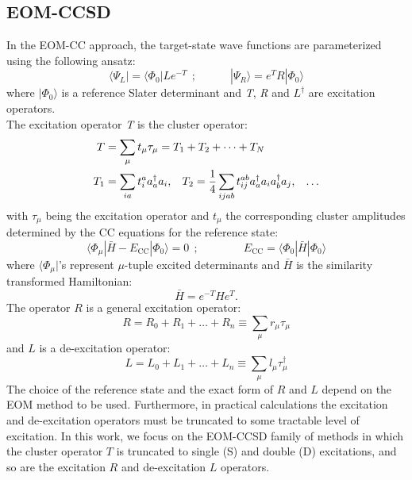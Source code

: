 \documentclass[journal=jctcce,manuscript=article]{achemso}
\begin{document}
\subsection{EOM-CCSD}
In the EOM-CC approach, the target-state wave functions are parameterized using the following ansatz:~\cite{sekino1984linear,Stanton:93:EOMCC,CC_EOMCC_Bartlett,krylov_eom_2008}
\begin{equation}
\langle \Psi_L | = \langle \Phi_0 |{L}e^{-T}~~;
\quad \quad \quad | \Psi_R \rangle =  e^{T} {R}| \Phi_0 \rangle 
\end{equation}
where $| \Phi_0 \rangle $ is a reference Slater determinant and \textit{T}, \textit{R} and $L^\dagger$ are excitation operators.\\
The excitation operator \textit{T} is the cluster operator:\cite{Note-1}
\begin{equation}
\begin{aligned}
T &= \sum_{\mu} t_{\mu} \tau_{\mu} = T_1 + T_2 + \dots + T_N \\
T_1 &= \sum_{ia} t_i^a a_a^{\dagger}a_i ,\hspace{0.3cm}  T_2 = \frac{1}{4}\sum_{ijab} t_{ij}^{ab} a_a^{\dagger}a_i a_b^{\dagger}a_j ,\hspace{0.3cm}\dots 
\end{aligned}
\end{equation}
with $\tau_{\mu}$ being the excitation operator and $t_{\mu}$ the corresponding cluster amplitudes determined by the CC equations for the reference state:
\begin{equation}
\label{amplitudes}
\langle \Phi_\mu | \bar{H} - E_\text{CC} | \Phi_0 \rangle = 0~~; 
\qquad\qquad E_\text{CC} = \langle \Phi_0| \bar{H} | \Phi_0 \rangle
\end{equation}
where $\langle \Phi_\mu |$'s represent $\mu$-tuple excited determinants and $\bar{H}$ is the similarity transformed Hamiltonian:
\begin{equation}
\bar{H} = e^{-T} H e^{T}.
\end{equation}
The operator $R$ is a general excitation operator:
  \begin{equation}
   R = R_0 + R_1 + \dots + R_n \equiv \sum_\mu r_\mu \tau_\mu
   \end{equation}
and $L$ is a de-excitation operator:
  \begin{equation}
   L = L_0 + L_1 + \dots + L_n \equiv \sum_\mu l_\mu \tau^\dagger_\mu
   \end{equation}
  The choice of the reference state and the exact form of $R$ and $L$ depend on the EOM method to be used\cite{krylov_eom_2008,CC_EOMCC_Bartlett}.
  Furthermore, in practical calculations the excitation and de-excitation operators must be truncated to some tractable level of excitation. 
In this work, we focus on the EOM-CCSD family of methods in which
the cluster operator $T$ is truncated to single (S) and double (D) excitations, and so are the excitation $R$ and de-excitation $L$ operators.
\end{document}
